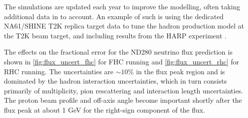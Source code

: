 The simulations are updated each year to improve the modelling, often taking additional data in to account. An example of such is using the dedicated NA61/SHINE T2K replica target data \cite{NA61_pions_rep} to tune the hadron production model at the T2K beam target, and including results from the HARP experiment \cite{harp}.

The effects on the fractional error for the ND280 neutrino flux prediction is shown in \autoref{fig:flux_uncert_fhc} for FHC running and \autoref{fig:flux_uncert_rhc} for RHC running. The uncertainties are $\sim10\%$ in the flux peak region and is dominated by the hadron interaction uncertainties, which in turn consists primarily of multiplicity, pion rescattering and interaction length uncertainties. The proton beam profile and off-axis angle become important shortly after the flux peak at about 1 GeV for the right-sign component of the flux.

